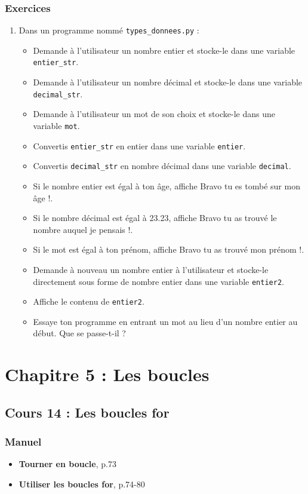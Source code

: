 \documentclass[11pt]{article}
\begin{document}
\subsubsection*{Exercices}
\label{sec:org0ff742c}
\begin{enumerate}
\item Dans un programme nommé \texttt{types\_donnees.py} :
\begin{itemize}
\item Demande à l'utilisateur un nombre entier et stocke-le dans une variable \texttt{entier\_str}.
\item Demande à l'utilisateur un nombre décimal et stocke-le dans une variable \texttt{decimal\_str}.
\item Demande à l'utilisateur un mot de son choix et stocke-le dans une variable \texttt{mot}.
\item Convertis \texttt{entier\_str} en entier dans une variable \texttt{entier}.
\item Convertis \texttt{decimal\_str} en nombre décimal dans une variable \texttt{decimal}.
\item Si le nombre entier est égal à ton âge, affiche \og Bravo tu es tombé sur mon âge !\fg{}.
\item Si le nombre décimal est égal à 23.23, affiche \og Bravo tu as trouvé le nombre auquel je pensais !\fg{}.
\item Si le mot est égal à ton prénom, affiche \og Bravo tu as trouvé mon prénom !\fg{}.
\item Demande à nouveau un nombre entier à l'utilisateur et stocke-le directement sous forme de nombre entier dans une variable \texttt{entier2}.
\item Affiche le contenu de \texttt{entier2}.
\item Essaye ton programme en entrant un mot au lieu d'un nombre entier au début. Que se passe-t-il ?
\end{itemize}
\end{enumerate}

\section*{Chapitre 5 : Les boucles}
\label{chapitre5}
\subsection*{Cours 14 : Les boucles for}
\label{chapitre5_cours14}
\subsubsection*{Manuel}
\label{sec:org0544bc5}
\begin{itemize}
\item \textbf{\og Tourner en boucle\fg{}}, p.73
\item \textbf{\og Utiliser les boucles for\fg{}}, p.74-80
\end{itemize}
\end{document}
